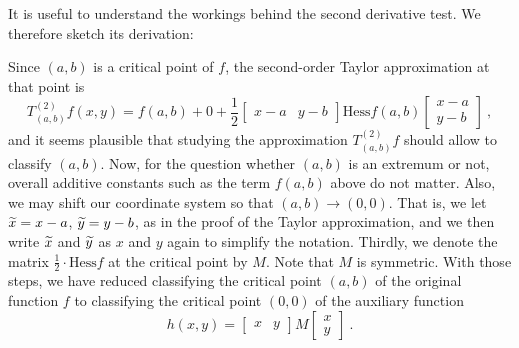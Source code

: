 \begin{remark}
\label{rem:schmiegquadriken}
It is useful to understand the workings behind the second derivative test. We therefore sketch its derivation:

Since $(a,b)$ is a critical point of $f$, the second-order Taylor approximation	at that point is 
\[ T_{(a,b)}^{(2)} f (x,y) = f(a,b) + 0 
 + \frac{1}{2} \begin{bmatrix} x-a & y-b \end{bmatrix}
\mathrm{Hess} f (a,b) \begin{bmatrix} x-a \\ y-b \end{bmatrix} \:, \]
and it seems plausible that studying the approximation $T_{(a,b)}^{(2)}f$ should allow to classify $(a,b)$. Now, for the question whether $(a,b)$ is an extremum or not, overall additive constants such as the term $f(a,b)$ above do not matter. Also, we may shift our coordinate system so that $(a,b)\rightarrow(0,0)$. That is, we let $\widetilde{x}=x-a$, $\widetilde{y}=y-b$, as in the proof of the Taylor approximation, and we then write $\widetilde{x}$ and $\widetilde{y}$ as $x$ and $y$ again to simplify the notation. Thirdly, we denote the matrix $\tfrac12 \cdot \mathrm{Hess}f$ at the critical point by $M$. Note that $M$ is symmetric. With those steps, we have reduced classifying the critical point $(a,b)$ of the original function $f$ to classifying the critical point $(0,0)$ of the auxiliary function
\[ h(x,y) = \begin{bmatrix}	x & y \end{bmatrix} M 
\begin{bmatrix} x \\ y \end{bmatrix} \:. \]


\end{remark}
